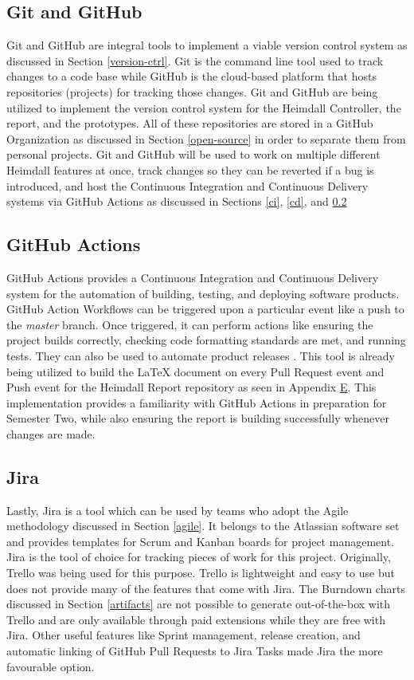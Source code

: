 \documentclass{article}
\begin{document}
\subsection{Git and GitHub}

Git and GitHub are integral tools to implement a viable version control system as discussed in Section \ref{version-ctrl}. Git is the command line tool used to track changes to a code base while GitHub is the cloud-based platform that hosts repositories (projects) for tracking those changes. Git and GitHub are being utilized to implement the version control system for the Heimdall Controller, the report, and the prototypes. All of these repositories are stored in a GitHub Organization as discussed in Section \ref{open-source} in order to separate them from personal projects. Git and GitHub will be used to work on multiple different Heimdall features at once, track changes so they can be reverted if a bug is introduced, and host the Continuous Integration and Continuous Delivery systems via GitHub Actions as discussed in Sections \ref{ci}, \ref{cd}, and \ref{gha}


\subsection{GitHub Actions} \label{gha}

GitHub Actions provides a Continuous Integration and Continuous Delivery system for the automation of building, testing, and deploying software products. GitHub Action Workflows can be triggered upon a particular event like a push to the \emph{master} branch. Once triggered, it can perform actions like ensuring the project builds correctly, checking code formatting standards are met, and running tests. They can also be used to automate product releases \cite{github-actions}. This tool is already being utilized to build the LaTeX document on every Pull Request event and Push event for the Heimdall Report repository as seen in Appendix \hyperlink{appendix-e}{E}. This implementation provides a familiarity with GitHub Actions in preparation for Semester Two, while also ensuring the report is building successfully whenever changes are made.


\subsection{Jira}

Lastly, Jira is a tool which can be used by teams who adopt the Agile methodology discussed in Section \ref{agile}. It belongs to the Atlassian software set and provides templates for Scrum and Kanban boards for project management. Jira is the tool of choice for tracking pieces of work for this project. Originally, Trello was being used for this purpose. Trello is lightweight and easy to use but does not provide many of the features that come with Jira. The Burndown charts discussed in Section \ref{artifacts} are not possible to generate out-of-the-box with Trello and are only available through paid extensions while they are free with Jira. Other useful features like Sprint management, release creation, and automatic linking of GitHub Pull Requests to Jira Tasks made Jira the more favourable option.
\end{document}
